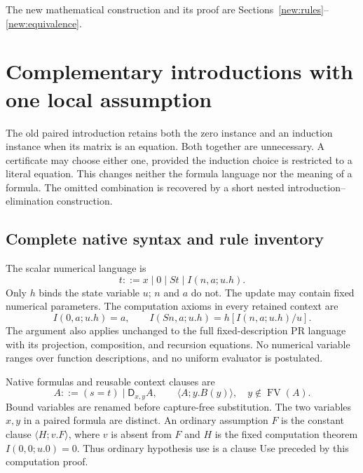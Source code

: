 \documentclass[11pt,letterpaper]{article}
\theoremstyle{definition}
\theoremstyle{remark}
\begin{document}
The new mathematical construction and its proof are
Sections~\ref{new:rules}--\ref{new:equivalence}.



\section{Complementary introductions with one local assumption}
\label{sec:choice-introduction}

The old paired introduction retains both the zero instance and an
induction instance when its matrix is an equation. Both together are
unnecessary. A certificate may choose either one, provided the induction
choice is restricted to a literal equation. This changes neither the
formula language nor the meaning of a formula. The omitted combination
is recovered by a short nested introduction--elimination construction.

\subsection{Complete native syntax and rule inventory}

The scalar numerical language is
\[
 t::=x\mid0\mid St\mid I(n,a;u.h).
\]
Only $h$ binds the state variable $u$; $n$ and $a$ do not.
The update may contain fixed numerical parameters. The computation
axioms in every retained context are
\[
 I(0,a;u.h)=a,\qquad
 I(Sn,a;u.h)=h[I(n,a;u.h)/u].
 \tag{I0, IS}\label{eq:choice-computations}
\]
The argument also applies unchanged to the full fixed-description PR
language with its projection, composition, and recursion equations.
No numerical variable ranges over function descriptions, and no uniform
evaluator is postulated.

Native formulas and reusable context clauses are
\[
 A::=(s=t)\mid\mathsf D_{x,y}A,\qquad
 \langle A;y.B(y)\rangle,\quad y\notin\operatorname{FV}(A).
\]
Bound variables are renamed before capture-free substitution.
The two variables $x,y$ in a paired formula are distinct.
An ordinary assumption $F$ is the constant clause
$\langle H;v.F\rangle$, where $v$ is absent from $F$ and $H$ is the
fixed computation theorem $I(0,0;u.0)=0$. Thus ordinary hypothesis
use is a clause Use preceded by this computation proof.
\end{document}
